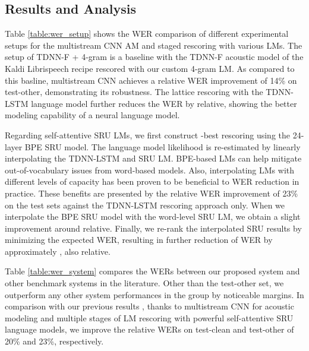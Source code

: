 \documentclass[a4paper]{article}
\begin{document}
\subsection{Results and Analysis}
Table \ref{table:wer_setup} shows the WER comparison of different experimental setups for the multistream CNN AM and staged rescoring with various LMs. The setup of TDNN-F + 4-gram is a baseline with the TDNN-F acoustic model of the Kaldi Librispeech recipe rescored with our custom 4-gram LM. As compared to this basline, multistream CNN achieves a relative WER improvement of 14\% on test-other, demonstrating its robustness. The lattice rescoring with the TDNN-LSTM language model further reduces the WER by  relative, showing the better modeling capability of a neural language model.

Regarding self-attentive SRU LMs, we first construct -best rescoring using the 24-layer BPE SRU model. The language model likelihood is re-estimated by linearly interpolating the TDNN-LSTM and SRU LM. BPE-based LMs can help mitigate out-of-vocabulary issues from word-based models. Also, interpolating LMs with different levels of capacity has been proven to be beneficial to WER reduction in practice. These benefits are presented by the relative WER improvement of 23\% on the test sets against the TDNN-LSTM rescoring approach only. When we interpolate the BPE SRU model with the word-level SRU LM, we obtain a slight improvement around  relative. Finally, we re-rank the interpolated SRU results by minimizing the expected WER, resulting in further reduction of WER by approximately , also relative.



Table \ref{table:wer_system} compares the WERs between our proposed system and other benchmark systems in the literature. Other than the test-other set, we outperform any other system performances in the group by noticeable margins. In comparison with our previous results \cite{han19-2}, thanks to multistream CNN for acoustic modeling and multiple stages of LM rescoring with powerful self-attentive SRU language models, we improve the relative WERs on test-clean and test-other of 20\% and 23\%, respectively.
\end{document}
